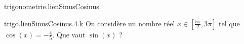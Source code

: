 \begin{qcm}{trigonometrie.lienSinusCosinus}
    \begin{question}{trigo.lienSinusCosinus.4.k}
         On considère un nombre réel \(x\in\left[\frac{5\pi}{2},3\pi\right]\) tel que \(\cos(x)=-\frac{4}{5}\). Que vaut \(\sin(x)\) ?
         \vspace{-1.5ex}
         \begin{multicols}{4}
         \begin{reponses}
         \end{reponses}
        \end{multicols}
    \end{question}
\end{qcm}
